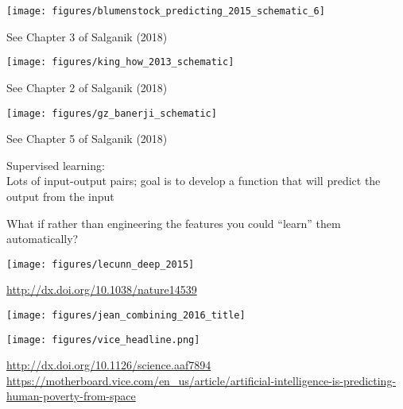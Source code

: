 \documentclass[aspectratio=169]{beamer}
\begin{document}
\begin{frame}

\begin{center}
\texttt{[image: figures/blumenstock\_predicting\_2015\_schematic\_6]}
\end{center}
\vfill
See Chapter 3 of Salganik (2018)
\end{frame}
\begin{frame}

\begin{center}
\texttt{[image: figures/king\_how\_2013\_schematic]}
\end{center}
\vfill
See Chapter 2 of Salganik (2018)
\end{frame}
\begin{frame}

\begin{center}
\texttt{[image: figures/gz\_banerji\_schematic]}
\end{center}
\vfill
See Chapter 5 of Salganik (2018)
\end{frame}
\begin{frame}

Supervised learning:\\
Lots of input-output pairs; goal is to develop a function that will predict the output from the input

\end{frame}
\begin{frame}

\Large{
\begin{center}
What if rather than engineering the features you could ``learn'' them automatically?
\end{center}
}
\end{frame}
\begin{frame}

\begin{center}
\texttt{[image: figures/lecunn\_deep\_2015]}
\end{center}
\vfill
\url{http://dx.doi.org/10.1038/nature14539}

\end{frame}
\begin{frame}

\begin{center}
\texttt{[image: figures/jean\_combining\_2016\_title]}
\end{center}

\pause

\begin{center}
\texttt{[image: figures/vice\_headline.png]}
\end{center}

\vfill
\url{http://dx.doi.org/10.1126/science.aaf7894}\\
\url{https://motherboard.vice.com/en_us/article/artificial-intelligence-is-predicting-human-poverty-from-space}

\end{frame}
\end{document}
